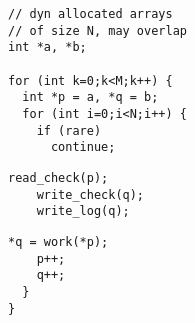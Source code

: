 \begin{lstlisting}[morekeywords={g_qCount},belowskip=0pt, name=ver3]
// dyn allocated arrays
// of size N, may overlap
int *a, *b;

for (int k=0;k<M;k++) {
  int *p = a, *q = b;
  for (int i=0;i<N;i++) {
    if (rare)
      continue;
\end{lstlisting}

\begin{lstlisting}[aboveskip=0pt,belowskip=0pt,backgroundcolor=\color{lightgray},
firstnumber=auto, name=ver3]
    read_check(p);
    write_check(q);
    write_log(q);
\end{lstlisting}

\begin{lstlisting}[aboveskip=0pt,belowskip=0pt, firstnumber=auto, name=ver3]
    *q = work(*p);
    p++;
    q++;
  }
}
\end{lstlisting}
